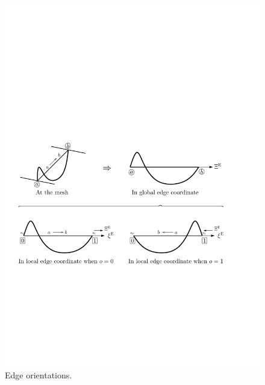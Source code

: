 \begin{figure}[!ht]
\begin{center}
\includegraphics[scale=0.75]{./figures/OrientationsEdge.pdf}
\caption{Edge orientations.}
\label{fig:orientationsedge}
\end{center}
\end{figure}

